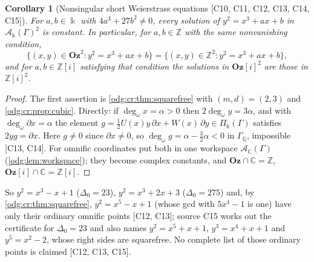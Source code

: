 \documentclass[11pt,oneside]{article}
\numberwithin{equation}{section}
\newtheorem{corollary}[corollary]{Corollary}
\theoremstyle{definition}
\theoremstyle{remark}
\newcommand{\Oz}{\mathbf{Oz}}
\newcommand{\Z}{\mathbb Z}
\newcommand{\Q}{\mathbb Q}
\newcommand{\C}{\mathbb C}
\newcommand{\ddeg}{\operatorname{deg}_{\omega}}
\newcommand{\src}[1]{\textup{\textsf{\small[#1]}}}
\newcommand{\Og}{\Oz[i]}
\newcommand{\crA}{\mathcal A_\Bbbk(\Gamma)}
\newcommand{\crP}{\Pi_\Bbbk(\Gamma)}
\begin{document}
\begin{corollary}[Nonsingular short Weierstrass equations \src{C10, C11, C12, C13, C14, C15}]\label{odg:cr:cor:weierstrass}
For $a,b\in\Bbbk$ with $4a^3+27b^2\ne0$, every solution of $y^2=x^3+ax+b$ in
$\crA^2$ is constant. In particular, for $a,b\in\Z$ with the same
nonvanishing condition,
\[
 \{(x,y)\in\Oz^2:y^2=x^3+ax+b\}=\{(x,y)\in\Z^2:y^2=x^3+ax+b\},
\]
and for $a,b\in\Z[i]$ satisfying that condition the solutions in $\Og^2$
are those in $\Z[i]^2$.
\end{corollary}
\begin{proof}
The first assertion is \cref{odg:cr:thm:squarefree} with $(m,d)=(2,3)$ and
\cref{odg:cr:prop:cubic}. Directly: if $\ddeg x=\alpha>0$ then $2\ddeg y=3\alpha$,
and with $\ddeg\partial x=\alpha$ the element
$g=\tfrac12U(x)y\,\partial x+W(x)\,\partial y\in\crP$ satisfies $2yg=\partial x$.
Here $g\ne0$ since $\partial x\ne0$, so
$\ddeg g=\alpha-\tfrac32\alpha<0$ in $\Gamma_\Q$, impossible \src{C13, C14}.
For omnific coordinates put both in one workspace $\mathcal A_\C(\Gamma)$
(\cref{odg:lem:workspace}); they become complex constants, and
$\Oz\cap\C=\Z$, $\Og\cap\C=\Z[i]$.
\end{proof}

So $y^2=x^3-x+1$ ($\Delta_0=23$), $y^2=x^3+2x+3$ ($\Delta_0=275$) and, by
\cref{odg:cr:thm:squarefree}, $y^2=x^5-x+1$ (whose gcd with $5x^4-1$ is one)
have only their ordinary omnific points \src{C12, C13}; source C15 works out the
certificate for $\Delta_0=23$ and also names $y^2=x^5+x+1$, $y^3=x^4+x+1$ and $y^5=x^2-2$,
whose right sides are squarefree. No complete list of those ordinary points is claimed
\src{C12, C13, C15}.
\end{document}
